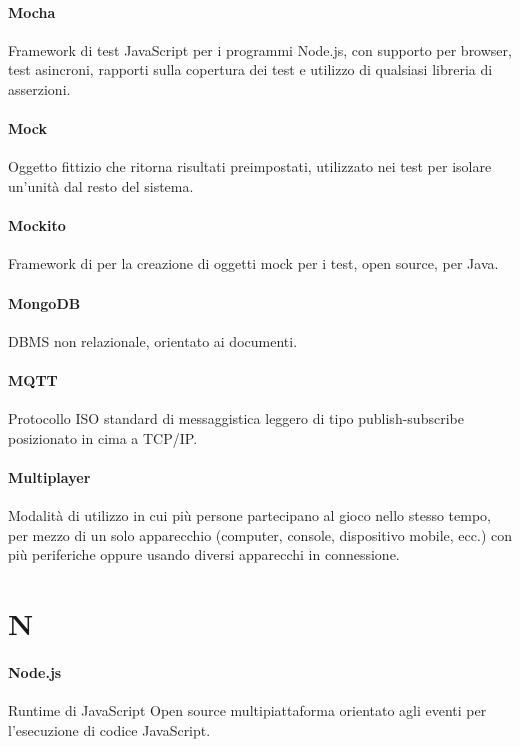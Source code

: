 \documentclass[]{article}
\begin{document}
	\paragraph*{Mocha}
	Framework di test JavaScript per i programmi Node.js, con supporto per browser, test asincroni, rapporti sulla copertura dei test e utilizzo di qualsiasi libreria di asserzioni.

    \paragraph*{Mock}
    Oggetto fittizio che ritorna risultati preimpostati, utilizzato nei test per isolare un'unità dal resto del sistema.

	\paragraph*{Mockito}
	Framework di per la creazione di oggetti mock per i test, open source, per Java.
	
	\paragraph*{MongoDB}
	DBMS non relazionale, orientato ai documenti.

	\paragraph*{MQTT}
	Protocollo ISO standard di messaggistica leggero di tipo publish-subscribe posizionato in cima a TCP/IP.

	\paragraph*{Multiplayer}
	Modalità di utilizzo in cui più persone partecipano al gioco nello stesso tempo, per mezzo di un solo apparecchio (computer, console, dispositivo mobile, ecc.) con più periferiche oppure usando diversi apparecchi in connessione.

	\newpage

	\section*{N}

	\paragraph*{Node.js}
	Runtime di JavaScript Open source multipiattaforma orientato agli eventi per l'esecuzione di codice JavaScript.
\end{document}
